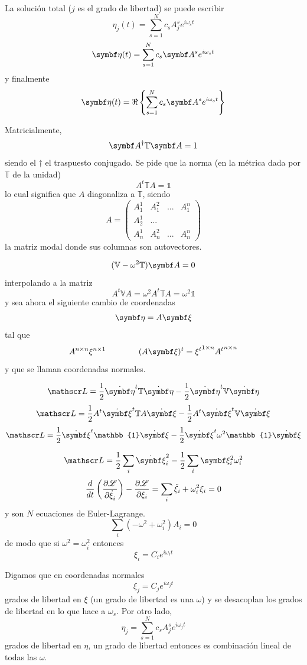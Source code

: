 \documentclass[10pt,oneside]{CBFT_book}
\begin{document}
La solución total ($j$ es el grado de libertad) se puede escribir 
\[
	\eta_j(t) = \sum_{s=1}^N c_s A_j^s e^{i\omega_s t}
\]
\[
	\vb{\eta}(t) = \sum_{s=1}^N c_s \vb{A}^s e^{i\omega_s t}
\]
y finalmente 
\[
	\vb{\eta}(t) = \Re \left\{ \sum_{s=1}^N c_s \vb{A}^s e^{i\omega_s t} \right\}
\]

Matricialmente,
\[
	\vb{A}^\dagger \mathbb{T} \vb{A} = 1
\]
siendo el $\dagger$ el traspuesto conjugado. Se pide que la norma (en la métrica dada por $\mathbb{T}$ de la unidad)
\[
	A^t \mathbb{T} A = \mathbb{1}
\]
lo cual significa que $A$ diagonaliza a $\mathbb{T}$, siendo 
\[
	A = \begin{pmatrix}
	     A_1^1 & A_1^2 & ... & A_1^n \\
	     A_2^1 & ... \\
	     A_n^1 & A_n^2 & ... & A_n^n 
	    \end{pmatrix}
\]
la matriz modal donde sus columnas son autovectores.

\[
	(\mathbb{V} - \omega^2 \mathbb{T})\vb{A} = 0
\]
interpolando a la matriz 
\[
	A^t \mathbb{V} A = \omega^2 A^t \mathbb{T} A= \omega^2 \mathbb{1}
\]
y sea ahora el siguiente cambio de coordenadas
\[
	\vb{\eta} = A \vb{\xi}
\]
tal que 
\[
	A^{n\times n} \xi^{n\times 1} \qquad \qquad  (A \vb{\xi} )^t = {\xi^t}^{1 \times n} {A^t}^{n \times n}
\]
y que se llaman coordenadas normales.

\[
	\Lag = \frac{1}{2} \dot{\vb{\eta}}^t \mathbb{T} \dot{\vb{\eta}} - \frac{1}{2} \dot{\vb{\eta}}^t \mathbb{V} \dot{\vb{\eta}}
\]
\[
	\Lag = \frac{1}{2} A^t\dot{\vb{\xi}}^t \mathbb{T} A \dot{\vb{\xi}} - \frac{1}{2} A^t\dot{\vb{\xi}}^t \mathbb{V} 
\dot{\vb{\xi}}
\]
\[
	\Lag = \frac{1}{2} \dot{\vb{\xi}}^t \mathbb{1} \dot{\vb{\xi}} - \frac{1}{2} \dot{\vb{\xi}}^t \omega^2 \mathbb{1} \dot{\vb{\xi}}
\]

\[
	\Lag = \frac{1}{2} \sum_i \dot{\vb{\xi}}_i^2 - \frac{1}{2} \sum_i \vb{\xi}_i^2 \omega^2_i 
\]
\[
	\frac{d}{dt}\left( \frac{\partial^{\hspace{-0.05em}} {\mathscr{L}}}{\partial {\dot{\xi}_i}^{\hspace{-0.05em}}} \right)- \frac{\partial^{\hspace{-0.05em}} {\mathscr{L}}}{\partial {\xi_i}^{\hspace{-0.05em}}} = \sum_i \ddot{\xi}_i + \omega^2_i \xi_i = 0 
\]
y son $N$ ecuaciones de Euler-Lagrange.
\[
	\sum_i ( -\omega^2 + \omega^2_i ) A_i = 0
\]
de modo que si $\omega^2 = \omega^2_i$ entonces
\[
	\xi_i = C_i e^{i\omega_i t}
\]

Digamos que en coordenadas normales
\[
	\xi_j = C_j e^{i \omega_j t}
\]
grados de libertad en $\xi$ (un grado de libertad es una $\omega$) y se desacoplan los grados de libertad
en lo que hace a $\omega_s$.
Por otro lado,
\[
	\eta_j = \sum_{s=1}^N c_s A_j^s e^{i \omega_j t}
\]
grados de libertad en $\eta$, un grado de libertad entonces es combinación lineal de todas las $\omega$.
\end{document}
